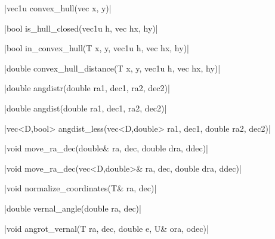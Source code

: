 \funcitem \cppinline|vec1u convex_hull(vec x, y)| 

\funcitem \cppinline|bool is_hull_closed(vec1u h, vec hx, hy)| 

\funcitem \vectorfunc \cppinline|bool in_convex_hull(T x, y, vec1u h, vec hx, hy)| 

\funcitem \vectorfunc \cppinline|double convex_hull_distance(T x, y, vec1u h, vec hx, hy)| 

\funcitem \vectorfunc \cppinline|double angdistr(double ra1, dec1, ra2, dec2)| 

\vectorfunc \cppinline|double angdist(double ra1, dec1, ra2, dec2)| 

\funcitem \cppinline|vec<D,bool> angdist_less(vec<D,double> ra1, dec1, double ra2, dec2)| 

\funcitem \cppinline|void move_ra_dec(double& ra, dec, double dra, ddec)| 

\cppinline|void move_ra_dec(vec<D,double>& ra, dec, double dra, ddec)|

\funcitem \cppinline|void normalize_coordinates(T& ra, dec)| 

\funcitem \cppinline|double vernal_angle(double ra, dec)| 

\funcitem \cppinline|void angrot_vernal(T ra, dec, double e, U& ora, odec)| 
